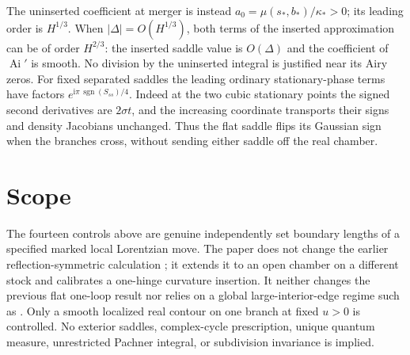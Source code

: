 \documentclass[11pt]{article}
\newcommand{\Ai}{\operatorname{Ai}}
\newcommand{\I}{\mathrm i}
\begin{document}
The uninserted coefficient at merger is instead \(a_0=\mu(s_*,b_*)/\kappa_*>0\); its leading order is \(H^{1/3}\). When \(|\Delta|=O(H^{1/3})\), both terms of the inserted approximation can be of order \(H^{2/3}\): the inserted saddle value is \(O(\Delta)\) and the coefficient of \(\Ai'\) is smooth. No division by the uninserted integral is justified near its Airy zeros. For fixed separated saddles the leading ordinary stationary-phase terms have factors \(e^{\I\pi\,\operatorname{sgn}(S_{ss})/4}\). Indeed at the two cubic stationary points the signed second derivatives are \(2\sigma t\), and the increasing coordinate transports their signs and density Jacobians unchanged. Thus the flat saddle flips its Gaussian sign when the branches cross, without sending either saddle off the real chamber.

\section{Scope}

The fourteen controls above are genuine independently set boundary lengths of a specified marked local Lorentzian move. The paper does not change the earlier reflection-symmetric calculation \cite{Paper22}; it extends it to an open chamber on a different stock and calibrates a one-hinge curvature insertion. It neither changes the previous flat one-loop result \cite{BD} nor relies on a global large-interior-edge regime such as \cite{Spines}. Only a smooth localized real contour on one branch at fixed \(u>0\) is controlled. No exterior saddles, complex-cycle prescription, unique quantum measure, unrestricted Pachner integral, or subdivision invariance is implied.
\end{document}
